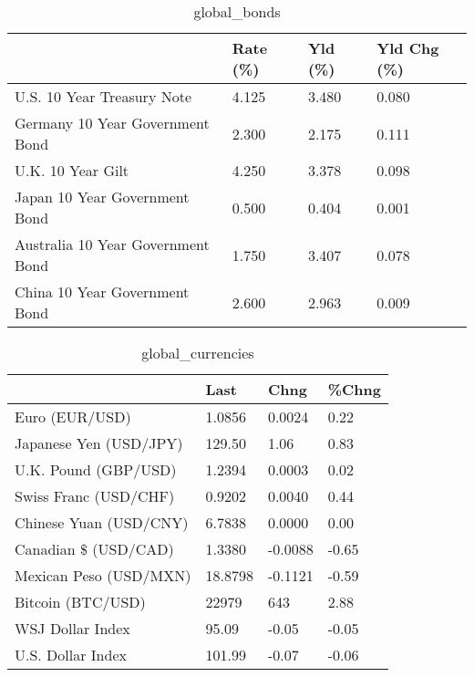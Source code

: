 \documentclass{article}%
\begin{document}
%


\begin{table}[htbp]%
\caption{global\_bonds}%
\centering%
\begin{adjustbox}{width=1\textwidth}%
\begin{tabular}{llll}
\toprule
                                  & Rate (\%) & Yld (\%) & Yld Chg (\%) \\
\midrule
       U.S. 10 Year Treasury Note &    4.125 &   3.480 &       0.080 \\
  Germany 10 Year Government Bond &    2.300 &   2.175 &       0.111 \\
                U.K. 10 Year Gilt &    4.250 &   3.378 &       0.098 \\
    Japan 10 Year Government Bond &    0.500 &   0.404 &       0.001 \\
Australia 10 Year Government Bond &    1.750 &   3.407 &       0.078 \\
    China 10 Year Government Bond &    2.600 &   2.963 &       0.009 \\
\bottomrule
\end{tabular}
%
\end{adjustbox}%
\end{table}

%


\begin{table}[htbp]%
\caption{global\_currencies}%
\centering%
\begin{adjustbox}{width=1\textwidth}%
\begin{tabular}{llll}
\toprule
                       &    Last &    Chng & \%Chng \\
\midrule
        Euro (EUR/USD) &  1.0856 &  0.0024 &  0.22 \\
Japanese Yen (USD/JPY) &  129.50 &    1.06 &  0.83 \\
  U.K. Pound (GBP/USD) &  1.2394 &  0.0003 &  0.02 \\
 Swiss Franc (USD/CHF) &  0.9202 &  0.0040 &  0.44 \\
Chinese Yuan (USD/CNY) &  6.7838 &  0.0000 &  0.00 \\
  Canadian \$ (USD/CAD) &  1.3380 & -0.0088 & -0.65 \\
Mexican Peso (USD/MXN) & 18.8798 & -0.1121 & -0.59 \\
     Bitcoin (BTC/USD) &   22979 &     643 &  2.88 \\
      WSJ Dollar Index &   95.09 &   -0.05 & -0.05 \\
     U.S. Dollar Index &  101.99 &   -0.07 & -0.06 \\
\bottomrule
\end{tabular}
%
\end{adjustbox}%
\end{table}
\end{document}

